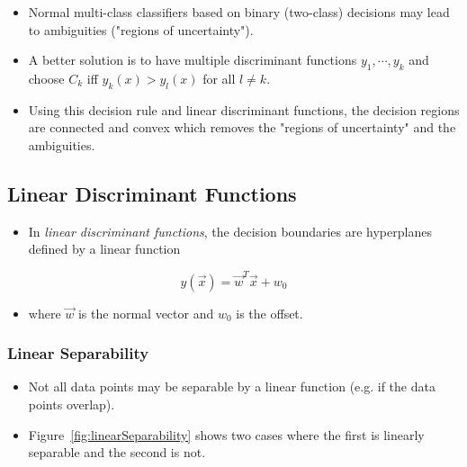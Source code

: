 		\begin{itemize}
			\item Normal multi-class classifiers based on binary (two-class) decisions may lead to ambiguities ("regions of uncertainty").
			\item A better solution is to have multiple discriminant functions \( y_1, \cdots, y_k \) and choose \( C_k \) iff \( y_k(x) > y_l(x) \) for all \( l \neq k \).
			\item Using this decision rule and linear discriminant functions, the decision regions are connected and convex which removes the "regions of uncertainty" and the ambiguities.
		\end{itemize}

	\subsection{Linear Discriminant Functions}
		\begin{itemize}
			\item In \emph{linear discriminant functions}, the decision boundaries are hyperplanes defined by a linear function
		\end{itemize}
		\begin{equation}
			y(\vec{x}) = \vec{w}^T \vec{x} + w_0
		\end{equation}
		\begin{itemize}
			\item[] where \(\vec{w}\) is the normal vector and \(w_0\) is the offset.
		\end{itemize}

		\subsubsection{Linear Separability}
			\begin{itemize}
				\item Not all data points may be separable by a linear function (e.g. if the data points overlap).
				\item Figure~\ref{fig:linearSeparability} shows two cases where the first is linearly separable and the second is not.
			\end{itemize}

